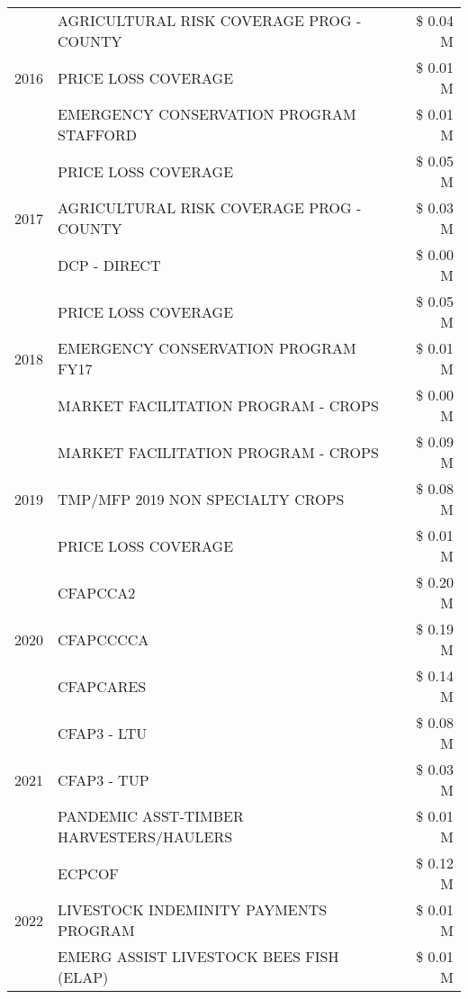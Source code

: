 \begin{tabular}{llr}
\cline{1-3}
\multirow[t]{3}{*}{2016} & AGRICULTURAL RISK COVERAGE PROG - COUNTY & \$ 0.04 M \\
 & PRICE LOSS COVERAGE & \$ 0.01 M \\
 & EMERGENCY CONSERVATION PROGRAM STAFFORD & \$ 0.01 M \\
\cline{1-3}
\multirow[t]{3}{*}{2017} & PRICE LOSS COVERAGE & \$ 0.05 M \\
 & AGRICULTURAL RISK COVERAGE PROG - COUNTY & \$ 0.03 M \\
 & DCP - DIRECT & \$ 0.00 M \\
\cline{1-3}
\multirow[t]{3}{*}{2018} & PRICE LOSS COVERAGE & \$ 0.05 M \\
 & EMERGENCY CONSERVATION PROGRAM FY17 & \$ 0.01 M \\
 & MARKET FACILITATION PROGRAM - CROPS & \$ 0.00 M \\
\cline{1-3}
\multirow[t]{3}{*}{2019} & MARKET FACILITATION PROGRAM - CROPS & \$ 0.09 M \\
 & TMP/MFP 2019 NON SPECIALTY CROPS & \$ 0.08 M \\
 & PRICE LOSS COVERAGE & \$ 0.01 M \\
\cline{1-3}
\multirow[t]{3}{*}{2020} & CFAPCCA2 & \$ 0.20 M \\
 & CFAPCCCCA & \$ 0.19 M \\
 & CFAPCARES & \$ 0.14 M \\
\cline{1-3}
\multirow[t]{3}{*}{2021} & CFAP3 - LTU & \$ 0.08 M \\
 & CFAP3 - TUP & \$ 0.03 M \\
 & PANDEMIC ASST-TIMBER HARVESTERS/HAULERS & \$ 0.01 M \\
\cline{1-3}
\multirow[t]{3}{*}{2022} & ECPCOF & \$ 0.12 M \\
 & LIVESTOCK INDEMINITY PAYMENTS PROGRAM & \$ 0.01 M \\
 & EMERG ASSIST LIVESTOCK BEES FISH (ELAP) & \$ 0.01 M \\
\cline{1-3}
\bottomrule
\end{tabular}
